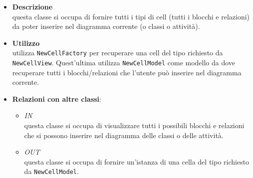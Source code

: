 \label{\nogloxy{swedesigner::client::model::NewCellModel}}
\begin{itemize}
\item \textbf{Descrizione}\\
questa classe si occupa di fornire tutti i tipi di cell (tutti i blocchi e relazioni) da poter inserire nel diagramma corrente (o classi o attività).
\item \textbf{Utilizzo}\\
utilizza \texttt{NewCellFactory} per recuperare una cell del tipo richiesto da \texttt{NewCellView}. Quest'ultima utilizza \texttt{NewCellModel} come modello da dove recuperare tutti i blocchi/relazioni che l'utente può inserire nel diagramma corrente.
\item \textbf{Relazioni con altre classi}:
\begin{itemize}
\item \textit{IN} \hyperref[\nogloxy{swedesigner::client::view::NewCellView}]{}\\
questa classe si occupa di visualizzare tutti i possibili blocchi e relazioni che si possono inserire nel diagramma delle classi o delle attività.
\item \textit{OUT} \hyperref[\nogloxy{swedesigner::client::model::NewCellFactory}]{}\\
questa classe si occupa di fornire un'istanza di una cella del tipo richiesto da \texttt{NewCellModel}. 
\end{itemize}
\end{itemize}

